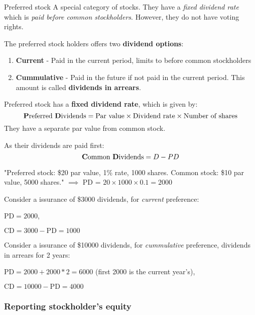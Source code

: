 \begin{theorem}
    {Preferred stock}
    A special category of stocks. They have a \textit{fixed dividend rate} which is \textit{paid before common stockholders}. However, they do not have voting rights.

    The preferred stock holders offers two \textbf{dividend options}:
    \begin{enumerate}
        \item \textbf{Current} - Paid in the current period, limits to before common stockholders
        \item \textbf{Cummulative} - Paid in the future if not paid in the current period. This amount is called \textbf{dividends in arrears}.
    \end{enumerate}
    Preferred stock has a \textbf{fixed dividend rate}, which is given by:
    \[\text{\textbf{P}referred \textbf{D}ividends} = \text{Par value} \times \text{Dividend rate} \times \text{Number of shares}\]
    They have a separate par value from common stock.

    As their dividends are paid first:
    \[\text{\textbf{C}ommon \textbf{D}ividends} = D - PD\]

    \tcblower

    "Preferred stock: \$20 par value, 1\% rate, 1000 shares. Common stock: \$10 par value, 5000 shares." $\implies$ PD = $20 \times 1000 \times 0.1 = 2000$

    Consider a issurance of \$3000 dividends, for \textit{current} preference:

    $\text{PD}=2000$,

    $\text{CD} = 3000 - \text{PD} = 1000$

    Consider a issurance of \$10000 dividends, for \textit{cummulative} preference, dividends in arrears for 2 years:

    $\text{PD} = 2000 + 2000 * 2 = 6000$ (first 2000 is the current year's),

    $\text{CD} = 10000 - \text{PD} = 4000$


\end{theorem}
\label{def:preferred_stock}

\subsubsection{Reporting stockholder's equity}

